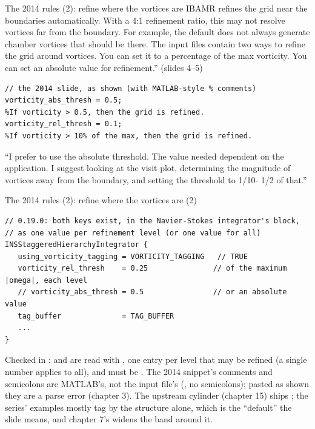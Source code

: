 \documentclass[aspectratio=169,11pt]{beamer}
\begin{document}
\begin{frame}[fragile]{The 2014 rules (2): refine where the vortices are}
\label{fr:refine}
\footnotesize {} IBAMR refines the grid near the boundaries automatically. With a 4:1 refinement ratio, this may not resolve vortices far from the boundary. For example, the default does not always generate chamber vortices that should be there. The input files contain two ways to refine the grid around vortices. You can set it to a percentage of the max vorticity. You can set an absolute value for refinement.'' (slides 4--5)
\begin{lstlisting}[style=inputtiny]
// the 2014 slide, as shown (with MATLAB-style % comments)
vorticity_abs_thresh = 0.5;
%If vorticity > 0.5, then the grid is refined.
vorticity_rel_thresh = 0.1;
%If vorticity > 10% of the max, then the grid is refined.
\end{lstlisting}
\footnotesize ``I prefer to use the absolute threshold. The value needed dependent on the application. I suggest looking at the visit plot, determining the magnitude of vortices away from the boundary, and setting the threshold to 1/10- 1/2 of that.''

\end{frame}

\begin{frame}[fragile]{The 2014 rules (2): refine where the vortices are (2)}
\label{fr:refine2}
\begin{lstlisting}[style=inputtiny]
// 0.19.0: both keys exist, in the Navier-Stokes integrator's block,
// as one value per refinement level (or one value for all)
INSStaggeredHierarchyIntegrator {
   using_vorticity_tagging = VORTICITY_TAGGING   // TRUE
   vorticity_rel_thresh    = 0.25               // of the maximum |omega|, each level
   // vorticity_abs_thresh = 0.5                // or an absolute value
   tag_buffer              = TAG_BUFFER
   ...
}
\end{lstlisting}
\footnotesize Checked in :  and  are read with , one entry per level that may be refined (a single number applies to all), and  must be . The 2014 snippet's \code{\%} comments and semicolons are MATLAB's, not the input file's (\code{//}, no semicolons); pasted as shown they are a parse error (chapter 3). The upstream cylinder (chapter 15) ships ; the series' examples mostly tag by the structure alone, which is the ``default'' the slide means, and chapter 7's  widens the band around it.
\end{frame}
\end{document}
